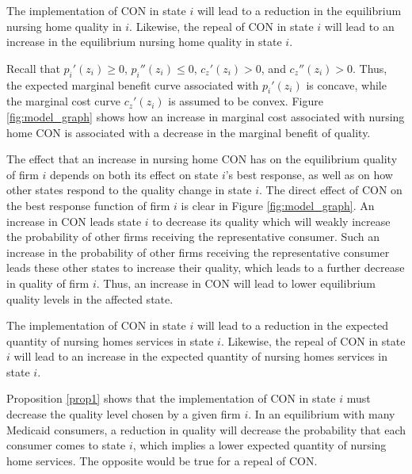 \documentclass[../Main.tex]{subfiles}
\begin{document}


\begin{Proposition}\label{prop1}
The implementation of CON in state $i$ will lead to a reduction in the equilibrium nursing home quality in $i$. Likewise, the repeal of CON in state $i$ will lead to an increase in the equilibrium nursing home quality in state $i$. 
\end{Proposition}


Recall that $p_{i}'(z_i)\geq 0$, $p_{i}''(z_i) \leq 0$, $c_z'(z_i)>0$, and $c_z''(z_i)>0$. Thus, the expected marginal benefit curve associated with $p_{i}'(z_i)$ is concave, while the marginal cost curve $c_z'(z_i)$ is assumed to be convex. Figure \ref{fig:model_graph} shows how an increase in marginal cost associated with nursing home CON is associated with a decrease in the marginal benefit of quality. 

The effect that an increase in nursing home CON has on the equilibrium quality of firm $i$ depends on both its effect on state $i$'s best response, as well as on how other states respond to the quality change in state $i$. The direct effect of CON on the best response function of firm $i$ is clear in Figure \ref{fig:model_graph}. An increase in CON leads state $i$ to decrease its quality which will weakly increase the probability of other firms receiving the representative consumer. Such an increase in the probability of other firms receiving the representative consumer leads these other states to increase their quality, which leads to a further decrease in quality of firm $i$. Thus, an increase in CON will lead to lower equilibrium quality levels in the affected state. 


\begin{Proposition}\label{prop2}
The implementation of CON in state $i$ will lead to a reduction in the expected quantity of nursing homes services in state $i$. Likewise, the repeal of CON in state $i$ will lead to an increase in the expected quantity of nursing homes services in state $i$. 
\end{Proposition}

Proposition \ref{prop1} shows that the implementation of CON in state $i$ must decrease the quality level chosen by a given firm $i$. In an equilibrium with many Medicaid consumers, a reduction in quality will decrease the probability that each consumer comes to state $i$, which implies a lower expected quantity of nursing home services. The opposite would be true for a repeal of CON. 
\end{document}
